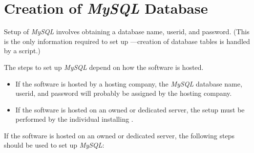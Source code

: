 \section{Creation of \emph{MySQL} Database}
\label{cist0:scmd0}

Setup of 
%
\emph{MySQL} involves obtaining a database name,
userid, and password.  (This is the only information
required to set up \emph{\productbasename{}}---creation of
database tables is handled by a script.)

The steps to set up \emph{MySQL} depend on how the software 
is hosted.

\begin{itemize}
\item If the software is hosted by a hosting company, the 
      \emph{MySQL} database name, userid, and password will probably
      be assigned by the hosting company.
\item If the software is hosted on an owned or dedicated server,
      the setup must be performed by the individual
      installing \emph{\productbasename{}}.
\end{itemize}

If the software is hosted on an owned or dedicated server,
the following steps should be used to set up \emph{MySQL}:

